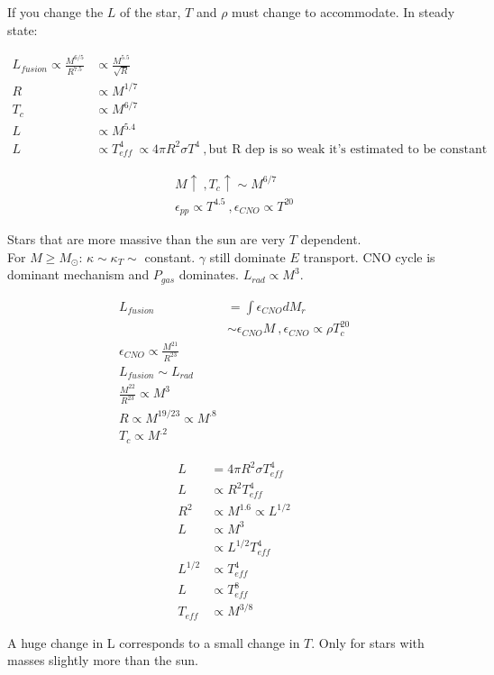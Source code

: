 \documentclass[10pt,letterpaper,final]{book}
\newcommand{\pt}{\propto}
\begin{document}
If you change the $L$ of the star, $T$ and $\rho$ must change to accommodate. In steady state:

\begin{align}
L_{fusion} \pt \frac{M^{6/5}}{R^{7.5}} & \pt \frac{ M^{5.5} }{\sqrt{R}}\\
R & \pt M^{1/7}\\
T_c &\pt M^{6/7}\\
L & \pt M^{5.4}\\
L & \pt T_{eff}^4~ \pt 4\pi R^2\sigma T^4~, \text{but R dep is so weak it's estimated to be constant}
\end{align}

\begin{align}
M \uparrow~,T_c \uparrow \sim M^{6/7}\\
\epsilon_{pp} \pt T^{4.5}~, \epsilon_{CNO} \pt T^{20}
\end{align}

Stars that are more massive than the sun are very $T$ dependent. \\

For $M \geq M_\odot$: $\kappa \sim \kappa_T \sim$ constant. $\gamma$ still dominate $E$ transport. CNO cycle is dominant mechanism and $P_{gas}$ dominates. $L_{rad} \pt M^3$.

\begin{align}
L_{fusion}&  = \int \epsilon_{CNO} dM_r\\
 & \sim \epsilon_{CNO}M~, \epsilon_{CNO} \pt \rho T_c^{20}\\
 \epsilon_{CNO} \pt \frac{M^{21}}{R^{23}}\\
 L_{fusion} \sim L_{rad}\\
  \frac{M^{22}}{R^{23}} \pt M^3\\
  R \pt M^{19/23} \pt M^{.8}\\
  T_c \pt M^{.2}
\end{align}

\begin{align}
L & = 4 \pi R^2 \sigma T_{eff}^4\\
L & \pt R^2 T_{eff}^4\\
R^2  & \pt M^{1.6} \pt L^{1/2}\\
L & \pt M^3\\
   & \pt L^{1/2}T_{eff}^4\\
L^{1/2} & \pt T_{eff}^4\\
L & \pt T_{eff}^8\\
T_{eff} & \pt M^{3/8}
\end{align}

A huge change in L corresponds to a small change in $T$. Only for stars with masses slightly more than the sun. \\
\end{document}
